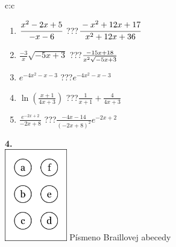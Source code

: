 \documentclass[10pt]{report}
\begin{document}
\begin{tabular}{c:c}
\begin{minipage}[c][104.5mm][t]{0.5\linewidth}
\begin{center}
\begin{minipage}{0.79\linewidth}
\begin{center}
\begin{varwidth}{\linewidth}
\begin{enumerate}
\item $\cfrac{x^2-2x+5}{-x-6}$\quad \dotfill\; ???\;\dotfill \quad $\cfrac{-x^2+12x+17}{x^2+12x+36}$
\item $\frac{-3}{x}\sqrt{-5x+3}$\quad \dotfill\; ???\;\dotfill \quad $\frac{-15x+18}{x^2 \sqrt{\smash[b]{-5x+3}}}$
\item $e^{-4x^2-x-3}$\quad \dotfill\; ???\;\dotfill \quad $e^{-4x^2-x-3}$
\item $\ln{\left(\frac{x+1}{4x+3}\right)}$\quad \dotfill\; ???\;\dotfill \quad $\frac{1}{x+1}+\frac{4}{4x+3}$
\item $\frac{e^{-2x+2}}{-2x+8}$\quad \dotfill\; ???\;\dotfill \quad $\frac{-4x-14}{(-2x+8)^2}e^{-2x+2}$
\end{enumerate}
\end{varwidth}
\end{center}
\end{minipage}
\begin{minipage}{0.20\linewidth}
\begin{center}
{\Huge\bfseries 4.} \\[2mm]
\includegraphics[height=40mm]{../images/braille.png}
{\small Písmeno Braillovej abecedy}
\end{center}
\end{minipage}
\end{center}
\end{minipage}
%
\end{tabular}
\newpage
\thispagestyle{empty}
\end{document}
